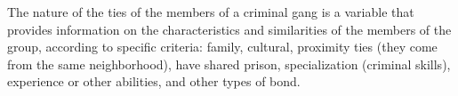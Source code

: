 The nature of the ties of the members of a criminal gang is a variable that provides information on the characteristics and similarities of the members of the group, according to specific criteria: family, cultural, proximity ties (they come from the same neighborhood), have shared prison, specialization (criminal skills), experience or other abilities, and other types of bond.
